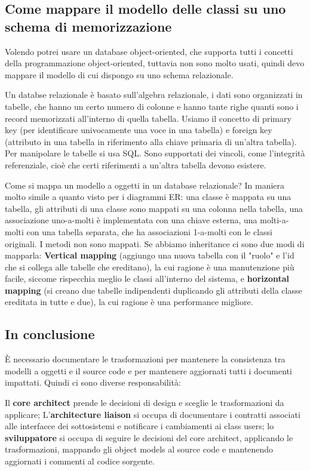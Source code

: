         \subsection{Come mappare il modello delle classi su uno schema di memorizzazione}
            Volendo potrei usare un database object-oriented, che supporta tutti i concetti della programmazione object-oriented, tuttavia non sono molto usati, quindi devo mappare il modello di cui dispongo su uno schema relazionale.
            
            Un databse relazionale è basato sull'algebra relazionale, i dati sono organizzati in tabelle, che hanno un certo numero di colonne e hanno tante righe quanti sono i record memorizzati all'interno di quella tabella. Usiamo il concetto di primary key (per identificare univocamente una voce in una tabella) e foreign key (attributo in una tabella in riferimento alla chiave primaria di un'altra tabella). Per manipolare le tabelle si usa SQL. Sono supportati dei vincoli, come l'integrità referenziale, cioè che certi riferimenti a un'altra tabella devono esistere.
            
            Come si mappa un modello a oggetti in un database relazionale? In maniera molto simile a quanto visto per i diagrammi ER: una classe è mappata su una tabella, gli attributi di una classe sono mappati su una colonna nella tabella, una associazione uno-a-molti è implementata con una chiave esterna, una molti-a-molti con una tabella separata, che ha associazioni 1-a-molti con le classi originali. I metodi non sono mappati. Se abbiamo inheritance ci sono due modi di mapparla: \textbf{Vertical mapping} (aggiungo una nuova tabella con il "ruolo" e l'id che si collega alle tabelle che ereditano), la cui ragione è una manutenzione più facile, siccome rispecchia meglio le classi all'interno del sistema, e \textbf{horizontal mapping} (si creano due tabelle indipendenti duplicando gli attributi della classe ereditata in tutte e due), la cui ragione è una performance migliore.
            
        \subsection{In conclusione}
            È necessario documentare le trasformazioni per mantenere la consistenza tra modelli a oggetti e il source code e per mantenere aggiornati tutti i documenti impattati. Quindi ci sono diverse responsabilità:
            
            Il \textbf{core architect} prende le decisioni di design e sceglie le trasformazioni da applicare; L'\textbf{architecture liaison} si occupa di documentare i contratti associati alle interfacce dei sottosistemi e notificare i cambiamenti ai class users; lo \textbf{sviluppatore} si occupa di seguire le decisioni del core architect, applicando le trasformazioni, mappando gli object models al source code e mantenendo aggiornati i commenti al codice sorgente.
            
